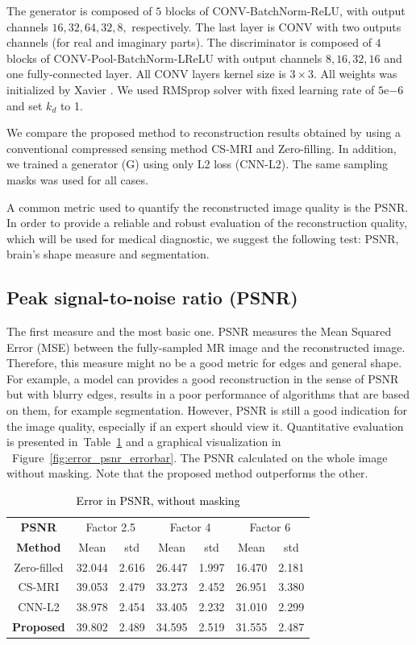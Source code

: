 \documentclass[review]{elsarticle}
\begin{document}
The generator is composed of $5$ blocks of CONV-BatchNorm-ReLU, with
output channels $16,32,64,32,8,$ respectively. The last layer is
CONV with two outputs channels (for real and imaginary parts). The
discriminator is composed of $4$ blocks of CONV-Pool-BatchNorm-LReLU
with output channels $8,16,32,16$ and one fully-connected layer.
All CONV layers kernel size is $3\times3$. All weights was initialized
by Xavier \cite{glorot2010understanding}. We used RMSprop solver with
fixed learning rate of $5\mathrm{e}{-6}$ and set $k_{d}$ to 1.

We compare the proposed method to reconstruction results obtained
by using a conventional compressed sensing method CS-MRI \cite{lustig2007sparse}
and Zero-filling. In addition, we trained a generator (G) using only
L2 loss (CNN-L2). The same sampling masks was used for all cases.

A common metric used to quantify the reconstructed image quality is the PSNR. In order to provide a reliable and robust evaluation of the reconstruction quality, which will be used for medical diagnostic, we suggest the following test: PSNR, brain's shape measure and segmentation.


\subsection{Peak signal-to-noise ratio (PSNR)}
The first measure and the most basic one. PSNR measures the Mean Squared Error (MSE) between the fully-sampled MR image and the reconstructed image. Therefore, this measure might no be a good metric for edges and general shape. For example, a model can provides a good reconstruction in the sense of PSNR but with blurry edges, results in a poor performance of algorithms that are based on them, for example segmentation.
However, PSNR is still a good indication for the image quality, especially if an expert should view it.
Quantitative evaluation is presented in~Table~\ref{tbl:PSNR_NO_MASK} and a graphical visualization in ~Figure~\ref{fig:error_psnr_errorbar}. The PSNR calculated on the whole image without masking. Note that the proposed method outperforms the other.

\begin{table}[H]
	\centering{}
\begin{tabular}{|c||c|c||c|c||c|c|}
	\hline 
	\textbf{PSNR} & \multicolumn{2}{c||}{Factor 2.5} & \multicolumn{2}{c||}{Factor 4} & \multicolumn{2}{c|}{Factor 6}\tabularnewline \cline{2-7}

	\textbf{Method}     &Mean   &std    &Mean   &std     &Mean   &std \tabularnewline \hline 	
	Zero-filled         &32.044 &2.616  &26.447 &1.997   &16.470 &2.181\tabularnewline
	CS-MRI              &39.053 &2.479  &33.273 &2.452   &26.951 &3.380\tabularnewline
	CNN-L2              &38.978 &2.454  &33.405 &2.232   &31.010 &2.299\tabularnewline
	\textbf{Proposed}   &39.802 &2.489  &34.595 &2.519   &31.555 &2.487\tabularnewline
		\hline 
	\end{tabular}\caption{\textcolor{black}{\footnotesize{}{}Error in PSNR, without masking}{\footnotesize{}\label{tbl:PSNR_NO_MASK}}}
\end{table}
\end{document}
